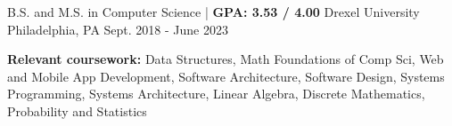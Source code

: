 

\begin{cventries}

  \cventry
  {B.S. and M.S. in Computer Science | \textbf{ GPA: 3.53 / 4.00}} %
  {Drexel University} %
  {Philadelphia, PA} %
  {Sept. 2018 - June 2023} %
  {
    \begin{cvitems} %
      \item {\color{darktext} \textbf{Relevant coursework:}} Data Structures, Math Foundations of Comp Sci, Web and Mobile App Development,
      Software Architecture, Software Design, Systems Programming, Systems Architecture,
      Linear Algebra, Discrete Mathematics, Probability and Statistics
    \end{cvitems}
  }

\end{cventries}
